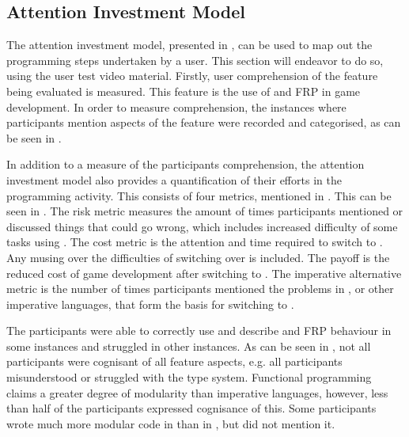 \subsection{Attention Investment Model}\label{sec:att-inv-app}
The attention investment model, presented in , can be used to map out the programming steps undertaken by a user. This section will endeavor to do so, using the user test video material. Firstly, user comprehension of the feature being evaluated is measured. This feature is the use of \fsh and \gls{FRP} in game development. In order to measure comprehension, the instances where participants mention aspects of the feature were recorded and categorised, as can be seen in .


In addition to a measure of the participants comprehension, the attention investment model also provides a quantification of their efforts in the programming activity. This consists of four metrics, mentioned in . This can be seen in . The risk metric measures the amount of times participants mentioned or discussed things that could go wrong, which includes increased difficulty of some tasks using \fsh. The cost metric is the attention and time required to switch to \fsh. Any musing over the difficulties of switching over is included. The payoff is the reduced cost of game development after switching to \fsh. The imperative alternative metric is the number of times participants mentioned the problems in \csh, or other imperative languages, that form the basis for switching to \fsh.


The participants were able to correctly use and describe \fsh and \gls{FRP} behaviour in some instances and struggled in other instances. As can be seen in , not all participants were cognisant of all feature aspects, e.g. all participants misunderstood or struggled with the type system. Functional programming claims a greater degree of modularity than imperative languages\cite{hughes1989functional}, however, less than half of the participants expressed cognisance of this. Some participants wrote much more modular code in \fsh than in \csh, but did not mention it.

